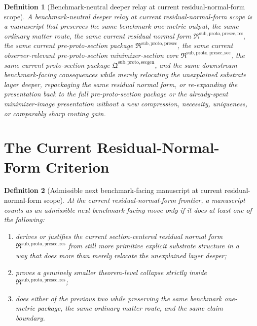 \documentclass[11pt]{article}
\newcommand{\PreProtoSectionPackage}{\mathfrak R^{\mathrm{sub,proto,presec}}}
\newcommand{\PreProtoSectionMinSectionCore}{\mathfrak R^{\mathrm{sub,proto,presec,sec}}}
\newcommand{\PreProtoSectionResidualPackage}{\mathfrak R^{\mathrm{sub,proto,presec,res}}}
\newcommand{\ProtoSectionPackage}{\mathfrak Q^{\mathrm{sub,proto,secgen}}}
\newtheorem{definition}{Definition}
\begin{document}
\begin{definition}[Benchmark-neutral deeper relay at current residual-normal-form scope]
A \emph{benchmark-neutral deeper relay at current residual-normal-form scope} is a manuscript that preserves the same benchmark one-metric output, the same ordinary matter route, the same current residual normal form \(\PreProtoSectionResidualPackage\), the same current pre-proto-section package \(\PreProtoSectionPackage\), the same current observer-relevant pre-proto-section minimizer-section core \(\PreProtoSectionMinSectionCore\), the same current proto-section package \(\ProtoSectionPackage\), and the same downstream benchmark-facing consequences while merely relocating the unexplained substrate layer deeper, repackaging the same residual normal form, or re-expanding the presentation back to the full pre-proto-section package or the already-spent minimizer-image presentation without a new compression, necessity, uniqueness, or comparably sharp routing gain.
\end{definition}

\section{The Current Residual-Normal-Form Criterion}

\begin{definition}[Admissible next benchmark-facing manuscript at current residual-normal-form scope]
At the current residual-normal-form frontier, a manuscript counts as an admissible next benchmark-facing move only if it does at least one of the following:
\begin{enumerate}
    \item derives or justifies the current section-centered residual normal form \(\PreProtoSectionResidualPackage\) from still more primitive explicit substrate structure in a way that does more than merely relocate the unexplained layer deeper;
    \item proves a genuinely smaller theorem-level collapse strictly inside \(\PreProtoSectionResidualPackage\);
    \item does either of the previous two while preserving the same benchmark one-metric package, the same ordinary matter route, and the same claim boundary.
\end{enumerate}
\end{definition}
\end{document}
